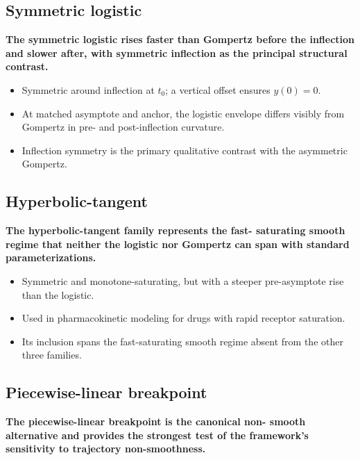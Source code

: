 \documentclass[
  11pt,
]{article}
\begin{document}
\subsection{Symmetric logistic}\label{symmetric-logistic}

\textbf{The symmetric logistic rises faster than Gompertz
before the inflection and slower after, with symmetric
inflection as the principal structural contrast.}

\begin{itemize}\setlength{\itemsep}{2pt}\setlength{\parskip}{0pt}
\item Symmetric around inflection at $t_0$; a vertical offset
  ensures $y(0) = 0$.
\item At matched asymptote and anchor, the logistic envelope
  differs visibly from Gompertz in pre- and post-inflection
  curvature.
\item Inflection symmetry is the primary qualitative contrast
  with the asymmetric Gompertz.
\end{itemize}

\subsection{Hyperbolic-tangent}\label{hyperbolic-tangent}

\textbf{The hyperbolic-tangent family represents the fast-
saturating smooth regime that neither the logistic nor Gompertz
can span with standard parameterizations.}

\begin{itemize}\setlength{\itemsep}{2pt}\setlength{\parskip}{0pt}
\item Symmetric and monotone-saturating, but with a steeper
  pre-asymptote rise than the logistic.
\item Used in pharmacokinetic modeling for drugs with rapid
  receptor saturation.
\item Its inclusion spans the fast-saturating smooth regime
  absent from the other three families.
\end{itemize}

\subsection{Piecewise-linear breakpoint}\label{piecewise-linear-breakpoint}

\textbf{The piecewise-linear breakpoint is the canonical non-
smooth alternative and provides the strongest test of the
framework's sensitivity to trajectory non-smoothness.}
\end{document}
